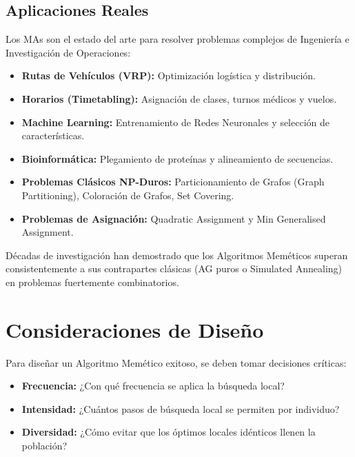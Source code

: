 \documentclass[notumble,10pt]{leaflet}
\begin{document}
\subsection{Aplicaciones Reales}
Los MAs son el estado del arte para resolver problemas complejos de Ingeniería e Investigación de Operaciones:
\begin{itemize}[leftmargin=*]
    \item \textbf{Rutas de Vehículos (VRP):} Optimización logística y distribución.
    \item \textbf{Horarios (Timetabling):} Asignación de clases, turnos médicos y vuelos.
    \item \textbf{Machine Learning:} Entrenamiento de Redes Neuronales y selección de características.
    \item \textbf{Bioinformática:} Plegamiento de proteínas y alineamiento de secuencias.
    \item \textbf{Problemas Clásicos NP-Duros:} Particionamiento de Grafos (Graph Partitioning), Coloración de Grafos, Set Covering.
    \item \textbf{Problemas de Asignación:} Quadratic Assignment y Min Generalised Assignment.
\end{itemize}

\begin{tcolorbox}[mybox, title=\textbf{1} Rendimiento Comprobado]
Décadas de investigación han demostrado que los Algoritmos Meméticos superan consistentemente a sus contrapartes clásicas (AG puros o Simulated Annealing) en problemas fuertemente combinatorios.
\end{tcolorbox}

\newpage

\section{Consideraciones de Diseño}

Para diseñar un Algoritmo Memético exitoso, se deben tomar decisiones críticas:

\begin{tcolorbox}[mybox, title=\textbf{=} Parámetros Clave]
\begin{itemize}[leftmargin=*]
    \item \textbf{Frecuencia:} ¿Con qué frecuencia se aplica la búsqueda local?
    \item \textbf{Intensidad:} ¿Cuántos pasos de búsqueda local se permiten por individuo?
    \item \textbf{Diversidad:} ¿Cómo evitar que los óptimos locales idénticos llenen la población?
\end{itemize}
\end{tcolorbox}
\end{document}
